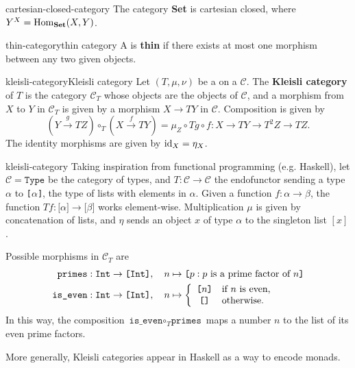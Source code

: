 \begin{example}{cartesian-closed-category}
    The category \textbf{Set} is cartesian closed, where $Y^X = \text{Hom}_\textbf{Set}(X, Y)$.
\end{example}

\begin{topic}{thin-category}{thin category}
    A  is \textbf{thin} if there exists at most one morphism between any two given objects.
\end{topic}


\begin{topic}{kleisli-category}{Kleisli category}
    Let $(T, \mu, \nu)$ be a  on a  $\mathcal{C}$. The \textbf{Kleisli category} of $T$ is the category $\mathcal{C}_T$ whose objects are the objects of $\mathcal{C}$, and a morphism from $X$ to $Y$ in $\mathcal{C}_T$ is given by a morphism $X \to TY$ in $\mathcal{C}$. Composition is given by
    \[ (Y \xrightarrow{g} TZ) \circ_T (X \xrightarrow{f} TY) = \mu_Z \circ Tg \circ f : X \to TY \to T^2 Z \to TZ . \]
    The identity morphisms are given by $\text{id}_X = \eta_X$.
\end{topic}

\begin{example}{kleisli-category}
    Taking inspiration from functional programming (e.g. Haskell), let $\mathcal{C} = \texttt{Type}$ be the category of types, and $T : \mathcal{C} \to \mathcal{C}$ the endofunctor sending a type $\alpha$ to \texttt{[$\alpha$]}, the type of lists with elements in $\alpha$. Given a function $f : \alpha \to \beta$, the function $Tf : \texttt{[}\alpha\texttt{]} \to \texttt{[}\beta\texttt{]}$ works element-wise.
    Multiplication $\mu$ is given by concatenation of lists, and $\eta$ sends an object $x$ of type $\alpha$ to the singleton list $[x]$.
    
    Possible morphisms in $\mathcal{C}_T$ are
    \[ \begin{aligned}
        \texttt{primes} &: \texttt{Int} \to \texttt{[Int]}, \quad n \mapsto \texttt{[}p : p \textup{ is a prime factor of } n\texttt{]} \\
        \texttt{is\_even} &: \texttt{Int} \to \texttt{[Int]}, \quad n \mapsto \left\{ \begin{array}{cl}
         \texttt{[$n$]} & \text{if $n$ is even,} \\
         \texttt{[]} & \text{otherwise.} \end{array} \right.
    \end{aligned} \]
    In this way, the composition $\texttt{is\_even} \circ_T \texttt{primes}$ maps a number $n$ to the list of its even prime factors.
    
    More generally, Kleisli categories appear in Haskell as a way to encode monads.
\end{example}

